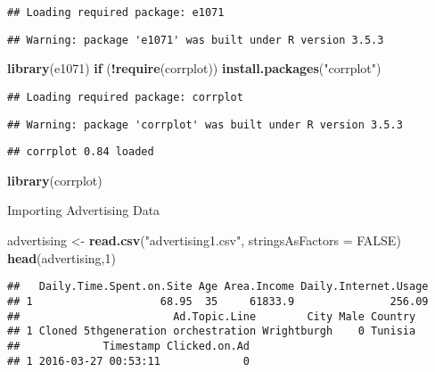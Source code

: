 \documentclass[]{article}
\newenvironment{Shaded}{\begin{snugshade}}{\end{snugshade}}
\newcommand{\KeywordTok}[1]{\textcolor[rgb]{0.13,0.29,0.53}{\textbf{#1}}}
\newcommand{\DataTypeTok}[1]{\textcolor[rgb]{0.13,0.29,0.53}{#1}}
\newcommand{\DecValTok}[1]{\textcolor[rgb]{0.00,0.00,0.81}{#1}}
\newcommand{\StringTok}[1]{\textcolor[rgb]{0.31,0.60,0.02}{#1}}
\newcommand{\OtherTok}[1]{\textcolor[rgb]{0.56,0.35,0.01}{#1}}
\newcommand{\ControlFlowTok}[1]{\textcolor[rgb]{0.13,0.29,0.53}{\textbf{#1}}}
\newcommand{\OperatorTok}[1]{\textcolor[rgb]{0.81,0.36,0.00}{\textbf{#1}}}
\newcommand{\NormalTok}[1]{#1}
\begin{document}
\begin{verbatim}
## Loading required package: e1071
\end{verbatim}

\begin{verbatim}
## Warning: package 'e1071' was built under R version 3.5.3
\end{verbatim}

\begin{Shaded}
\begin{Highlighting}[]
\KeywordTok{library}\NormalTok{(e1071)}
\ControlFlowTok{if}\NormalTok{ (}\OperatorTok{!}\KeywordTok{require}\NormalTok{(corrplot)) }\KeywordTok{install.packages}\NormalTok{(}\StringTok{"corrplot"}\NormalTok{)}
\end{Highlighting}
\end{Shaded}

\begin{verbatim}
## Loading required package: corrplot
\end{verbatim}

\begin{verbatim}
## Warning: package 'corrplot' was built under R version 3.5.3
\end{verbatim}

\begin{verbatim}
## corrplot 0.84 loaded
\end{verbatim}

\begin{Shaded}
\begin{Highlighting}[]
\KeywordTok{library}\NormalTok{(corrplot)}
\end{Highlighting}
\end{Shaded}

Importing Advertising Data

\begin{Shaded}
\begin{Highlighting}[]
\NormalTok{advertising <-}\StringTok{ }\KeywordTok{read.csv}\NormalTok{(}\StringTok{"advertising1.csv"}\NormalTok{, }\DataTypeTok{stringsAsFactors =} \OtherTok{FALSE}\NormalTok{)}
\KeywordTok{head}\NormalTok{(advertising,}\DecValTok{1}\NormalTok{)}
\end{Highlighting}
\end{Shaded}

\begin{verbatim}
##   Daily.Time.Spent.on.Site Age Area.Income Daily.Internet.Usage
## 1                    68.95  35     61833.9               256.09
##                        Ad.Topic.Line        City Male Country
## 1 Cloned 5thgeneration orchestration Wrightburgh    0 Tunisia
##             Timestamp Clicked.on.Ad
## 1 2016-03-27 00:53:11             0
\end{verbatim}
\end{document}
